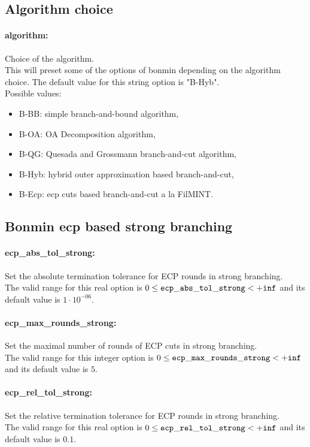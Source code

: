 \subsection{Algorithm choice}
\label{sec:Algorithm_choice}
\paragraph{algorithm:} Choice of the algorithm. $\;$ \\
 This will preset some of the options of bonmin
depending on the algorithm choice.
The default value for this string option is "B-Hyb".
\\ 
Possible values:
\begin{itemize}
   \item B-BB: simple branch-and-bound algorithm,
   \item B-OA: OA Decomposition algorithm,
   \item B-QG: Quesada and Grossmann branch-and-cut algorithm,
   \item B-Hyb: hybrid outer approximation based branch-and-cut,
   \item B-Ecp: ecp cuts based branch-and-cut a la FilMINT.
\end{itemize}

\subsection{Bonmin ecp based strong branching}
\label{sec:Bonmin_ecp_based_strong_branching}
\paragraph{ecp\_abs\_tol\_strong:} Set the absolute termination tolerance for ECP rounds in strong branching. $\;$ \\
 The valid range for this real option is 
$0 \le {\tt ecp\_abs\_tol\_strong } <  {\tt +inf}$
and its default value is $1 \cdot 10^{-06}$.


\paragraph{ecp\_max\_rounds\_strong:} Set the maximal number of rounds of ECP cuts in strong branching. $\;$ \\
 The valid range for this integer option is
$0 \le {\tt ecp\_max\_rounds\_strong } <  {\tt +inf}$
and its default value is $5$.


\paragraph{ecp\_rel\_tol\_strong:} Set the relative termination tolerance for ECP rounds in strong branching. $\;$ \\
 The valid range for this real option is 
$0 \le {\tt ecp\_rel\_tol\_strong } <  {\tt +inf}$
and its default value is $0.1$.


